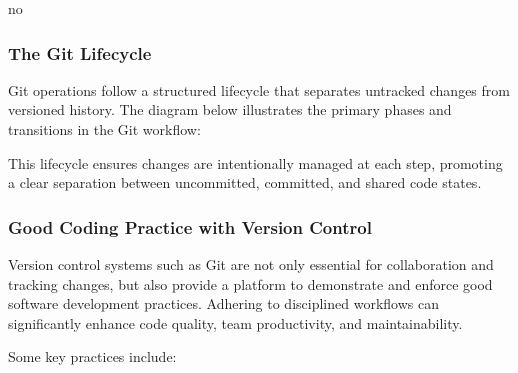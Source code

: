 no\documentclass{article}
\begin{document}
\subsubsection{The Git Lifecycle}

Git operations follow a structured lifecycle that separates untracked changes from versioned history. The diagram below illustrates the primary phases and transitions in the Git workflow:

\begin{center}
\end{center}

This lifecycle ensures changes are intentionally managed at each step, promoting a clear separation between uncommitted, committed, and shared code states.

\subsubsection{Good Coding Practice with Version Control}

Version control systems such as Git are not only essential for collaboration and tracking changes, but also provide a platform to demonstrate and enforce good software development practices. Adhering to disciplined workflows can significantly enhance code quality, team productivity, and maintainability.

Some key practices include:
\end{document}
